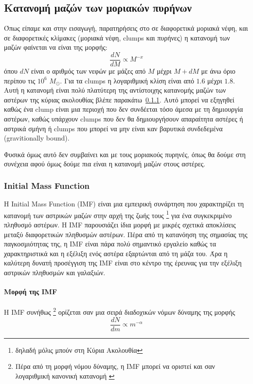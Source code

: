 \documentclass[a4paper,11pt]{memoir}
\newcommand{\sm}{$M_{\odot}$}
\begin{document}
\subsection{Κατανομή μαζών των μοριακών πυρήνων} 
Όπως είπαμε και στην εισαγωγή, παρατηρήσεις στο  σε διαφορετικά μοριακά νέφη, και σε διαφορετικές κλίμακες (μοριακά νέφη, clumps και πυρήνες) η κατανομή των μαζών φαίνεται να είναι της μορφής:
\begin{equation}
\frac{dN}{dM} \propto M^{-x}
\end{equation}
όπου $dN$ είναι ο αριθμός των νεφών με μάζες από $M$ μέχρι $M+dM$ με άνω όριο περίπου τις $10^6$ \sm. Για τα clumps η λογαριθμική κλίση είναι από $1.6$ μέχρι $1.8$.
Αυτή η κατανομή είναι πολύ πλατύτερη της αντίστοιχης κατανομής μαζών των αστέρων της κύριας ακολουθίας βλέπε παρακάτω~\ref{par:imf}. Αυτό μπορεί να εξηγηθεί καθώς ένα clump είναι μια περιοχή που δεν συνδέεται τόσο άμεσα με τη δημιουργία αστέρων, καθώς υπάρχουν clumps που δεν θα δημιουργήσουν απαραίτητα αστέρες ή αστρικά σμήνη ή clumps που μπορεί να μην είναι καν βαρυτικά συνδεδεμένα (gravitionally bound).

Φυσικά όμως αυτό δεν συμβαίνει και με τους μοριακούς πυρηνές, όπως θα δούμε στη συνέχεια αφού όμως δούμε πια είναι η κατανομή μαζών στους αστέρες.

\subsubsection{Initial Mass Function}
\label{par:imf}
Η Initial Mass Function (IMF) είναι μια εμπειρική συνάρτηση που χαρακτηρίζει τη κατανομή των αστρικών μαζών στην αρχή της ζωής τους \footnote{δηλαδή μόλις μπούν στη Κύρια Ακολουθία} για ένα συγκεκριμένο πληθυσμό αστέρων. Η IMF παρουσιάζει ίδια μορφή με μικρές σχετικά αποκλίσεις μεταξύ διαφορετικών πληθυσμών αστέρων. 
Πέρα από τη κατανόηση της σημασίας της παγκοσμιότητας της, η IMF είναι πάρα πολύ σημαντικό εργαλείο καθώς τα χαρακτηριστικά και η εξέλιξη ενός αστέρα εξαρτώνται από τη μάζα του. 
Άρα η καλύτερη δυνατή προσέγγιση της IMF είναι στο κέντρο της έρευνας για την εξέλιξη αστρικών πληθυσμών και γαλαξιών.

\paragraph{Μορφή της IMF}
Η IMF συνήθως \footnote{Πέρα από τη μορφή νόμου δύναμης, η IMF μπορεί να οριστεί και σαν λογαριθμική κανονική κατανομή \cite{salpeter_initial_2005}} ορίζεται σαν μια σειρά διαδοχικών νόμων δύναμης της μορφής 
\begin{equation}
\frac{dN}{dm} \propto m^{-\alpha}
\end{equation}
\end{document}
